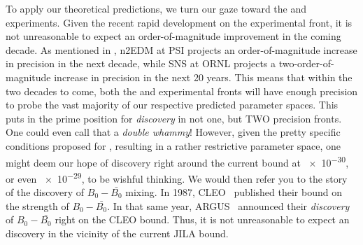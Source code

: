 To apply our theoretical predictions, we turn our gaze toward the {\eedm} and {\nedm} experiments.
Given the recent rapid development on the {\eedm} experimental front, 
it is not unreasonable to expect an order-of-magnitude improvement in the coming decade.
As mentioned in , 
n2EDM at PSI projects an order-of-magnitude increase in precision in the next decade,
while SNS at ORNL projects a two-order-of-magnitude increase in precision in the next 20 years.
This means that within the two decades to come,
both the {\eedm} and {\nedm} experimental fronts will have enough precision to probe the vast majority of our respective predicted {\gthdm} parameter spaces.
This puts {\gthdm} in the prime position for \emph{discovery} in not one, but TWO precision fronts.
One could even call that a \emph{double whammy}!
However, given the pretty specific conditions proposed for {\eedm}, 
resulting in a rather restrictive parameter space,
one might deem our hope of discovery right around the current bound at \num{e-30}, or even \num{e-29},
to be wishful thinking.
We would then refer you to the story of the discovery of \(B_{0} - \bar{B_{0}} \) mixing.
In 1987, CLEO~\cite{CLEO1987BBbarMixing} published their bound on the strength of \(B_{0} - \bar{B_{0}} \).
In that same year, ARGUS~\cite{ARGUS1987BBbarMixing} announced their \emph{discovery} of \(B_{0} - \bar{B_{0}} \) right on the CLEO bound.
Thus, it is not unreasonable to expect an {\eedm} discovery in the vicinity of the current JILA bound.

% 